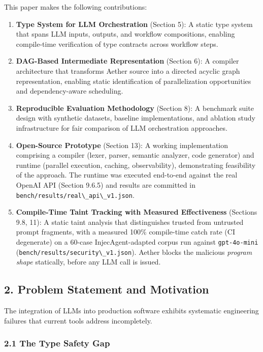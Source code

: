 \documentclass[
]{article}
\newcommand{\passthrough}[1]{#1}
\begin{document}
This paper makes the following contributions:

\begin{enumerate}
\def\labelenumi{\arabic{enumi}.}
\item
  \textbf{Type System for LLM Orchestration} (Section 5): A static type
  system that spans LLM inputs, outputs, and workflow compositions,
  enabling compile-time verification of type contracts across workflow
  steps.
\item
  \textbf{DAG-Based Intermediate Representation} (Section 6): A compiler
  architecture that transforms Aether source into a directed acyclic
  graph representation, enabling static identification of
  parallelization opportunities and dependency-aware scheduling.
\item
  \textbf{Reproducible Evaluation Methodology} (Section 8): A benchmark
  suite design with synthetic datasets, baseline implementations, and
  ablation study infrastructure for fair comparison of LLM orchestration
  approaches.
\item
  \textbf{Open-Source Prototype} (Section 13): A working implementation
  comprising a compiler (lexer, parser, semantic analyzer, code
  generator) and runtime (parallel execution, caching, observability),
  demonstrating feasibility of the approach. The runtime was executed
  end-to-end against the real OpenAI API (Section 9.6.5) and results are
  committed in
  \passthrough{\lstinline!bench/results/real\_api\_v1.json!}.
\item
  \textbf{Compile-Time Taint Tracking with Measured Effectiveness}
  (Sections 9.8, 11): A static taint analysis that distinguishes trusted
  from untrusted prompt fragments, with a measured 100\% compile-time
  catch rate (CI degenerate) on a 60-case InjecAgent-adapted corpus run
  against \passthrough{\lstinline!gpt-4o-mini!}
  (\passthrough{\lstinline!bench/results/security\_v1.json!}). Aether
  blocks the malicious \emph{program shape} statically, before any LLM
  call is issued.
\end{enumerate}

\subsection{2. Problem Statement and
Motivation}\label{problem-statement-and-motivation}

The integration of LLMs into production software exhibits systematic
engineering failures that current tools address incompletely.

\subsubsection{2.1 The Type Safety Gap}\label{the-type-safety-gap}
\end{document}
